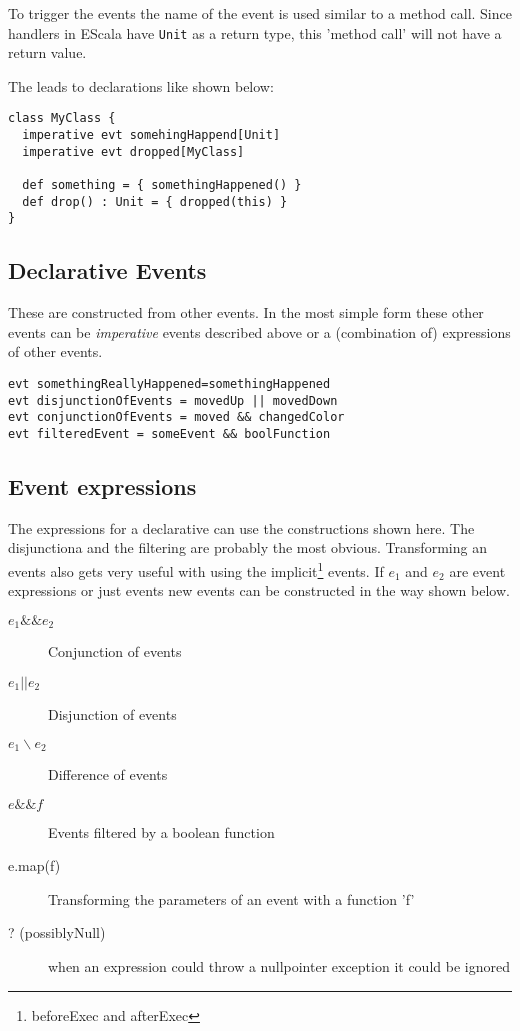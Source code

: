 \documentclass{article}
\newcommand{\escala}[0]{EScala }
\begin{document}
To trigger the events the name of the event is used similar to a method
call. Since handlers in \escala have {\tt Unit} as a return type, this
'method call' will not have a return value.

The leads to declarations like shown below:
\begin{lstlisting}
class MyClass {
  imperative evt somehingHappend[Unit]
  imperative evt dropped[MyClass]
  
  def something = { somethingHappened() }
  def drop() : Unit = { dropped(this) }
}
\end{lstlisting}

\subsection{Declarative Events}
These are constructed from other events. In the most simple form these
other events can be \emph{imperative} events described above or a
(combination of) expressions of other events.

\begin{lstlisting}
evt somethingReallyHappened=somethingHappened
evt disjunctionOfEvents = movedUp || movedDown
evt conjunctionOfEvents = moved && changedColor
evt filteredEvent = someEvent && boolFunction 
\end{lstlisting}


\subsection{Event expressions}

The expressions for a declarative can use the constructions shown
here. The disjunctiona and the filtering are probably the most
obvious. Transforming an events also gets very useful with using
the implicit\footnote{beforeExec and afterExec} events. If $e_1$
and $e_2$ are event expressions or just events new events can
be constructed in the way shown below.

\begin{description}
\item [ $e_1 \&\& e_2$ ] Conjunction of events
\item [ $e_1 || e_2$] Disjunction of events
\item [ $e_1 \backslash e_2$ ] Difference of events
\item [ $ e \&\& f $] Events filtered by a boolean function
\item [ e.map(f) ] Transforming the parameters of an event with a function 'f'
\item [ ? (possiblyNull) ] when an expression could throw a nullpointer exception it could be ignored
\end{description}
\end{document}
